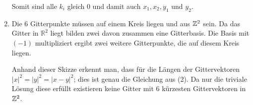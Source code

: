 \begin{enumerate}[(1)]
		Somit sind alle $k_i$ gleich $0$ und damit auch $x_1, x_2, y_1$ und $y_2$.

	\item
		Die $6$ Gitterpunkte müssen auf einem Kreis liegen und aus
		$\mathbb{Z}^2$ sein. Da das Gitter in $\mathbb{R}^2$ liegt bilden zwei
		davon zusammen eine Gitterbasis. Die Basis mit $(-1)$
		multipliziert ergibt zwei weitere Gitterpunkte, die auf diesem
		Kreis liegen.

		\begin{center}
		\end{center}

		Anhand dieser Skizze erkennt man, dass für die Längen der
		Gittervektoren $|x|^2 = |y|^2 = |x-y|^2$; dies ist genau die
		Gleichung aus (2). Da nur die triviale Lösung diese erfüllt
		existieren keine Gitter mit $6$ kürzesten Gittervektoren in
		$\mathbb{Z}^2$.
\end{enumerate}

